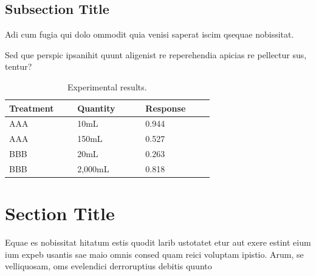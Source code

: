 \documentclass[
]{ImperialPoster}
\begin{document}
\begin{multicols}{3}
	\subsection{Subsection Title}
	
	Adi cum fugia qui dolo ommodit quia venisi saperat iscim qsequae nobissitat.
	
	Sed que perspic ipsanihit quunt aligenist re reperehendia apicias re pellectur sus, tentur? 
	
	\begin{table}[H] %
		\caption{Experimental results.}
		\begin{tabular}{L{0.26\linewidth} C{0.26\linewidth} R{0.26\linewidth}}
			\toprule
			Treatment & Quantity & Response\\
			\midrule
			AAA & 10mL & 0.944\\
			AAA & 150mL & 0.527\\
			BBB & 20mL & 0.263\\
			BBB & 2,000mL & 0.818\\
			\bottomrule
		\end{tabular}
	\end{table}
		
	\columnbreak %
	
	
	\section{Section Title}
	
	Equae es nobissitat hitatum estis quodit larib ustotatet etur aut exere estint eium ium expeb usantis sae maio omnis consed quam reici voluptam ipistio. Arum, se velliquosam, oms evelendici derroruptius debitis quunto
	
	

\end{multicols}
\end{document}
